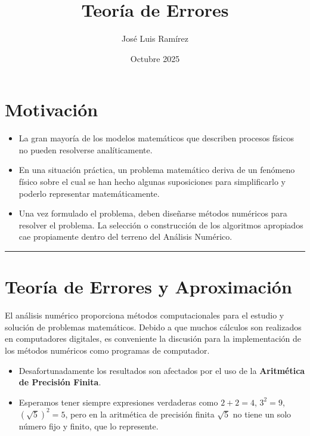 \documentclass[
]{article}
\title{Teoría de Errores}
\author{José Luis Ramírez}
\date{Octubre 2025}
\providecommand{\tightlist}{%
  \setlength{\itemsep}{0pt}\setlength{\parskip}{0pt}}
\begin{document}
\maketitle

{
\setcounter{tocdepth}{3}
\tableofcontents
}
\section{Motivación}\label{motivaciuxf3n}

\begin{itemize}
\tightlist
\item
  La gran mayoría de los modelos matemáticos que describen procesos
  físicos no pueden resolverse analíticamente.
\item
  En una situación práctica, un problema matemático deriva de un
  fenómeno físico sobre el cual se han hecho algunas suposiciones para
  simplificarlo y poderlo representar matemáticamente.
\item
  Una vez formulado el problema, deben diseñarse métodos numéricos para
  resolver el problema. La selección o construcción de los algoritmos
  apropiados cae propiamente dentro del terreno del Análisis Numérico.
\end{itemize}

\begin{center}\rule{0.5\linewidth}{0.5pt}\end{center}

\section{Teoría de Errores y
Aproximación}\label{teoruxeda-de-errores-y-aproximaciuxf3n}

El análisis numérico proporciona métodos computacionales para el estudio
y solución de problemas matemáticos. Debido a que muchos cálculos son
realizados en computadores digitales, es conveniente la discusión para
la implementación de los métodos numéricos como programas de computador.

\begin{itemize}
\tightlist
\item
  Desafortunadamente los resultados son afectados por el uso de la
  \textbf{Aritmética de Precisión Finita}.
\item
  Esperamos tener siempre expresiones verdaderas como \(2 + 2 = 4\),
  \(3^2 = 9\), \((\sqrt{5})^2 = 5\), pero en la aritmética de precisión
  finita \(\sqrt{5}\) no tiene un solo número fijo y finito, que lo
  represente.
\end{itemize}
\end{document}
